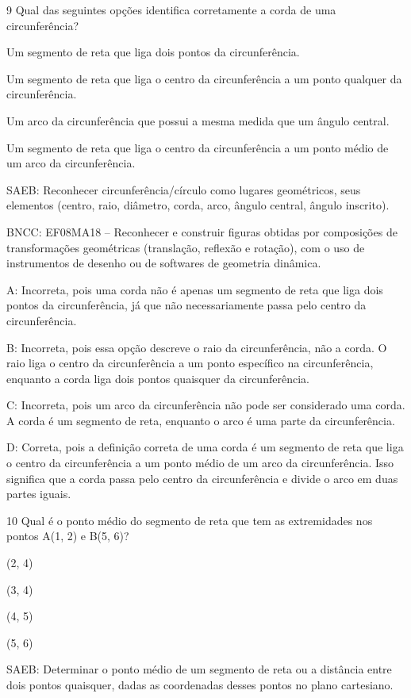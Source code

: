 {\num{9} Qual das seguintes opções identifica corretamente a corda de uma
circunferência?
\item Um segmento de reta que liga dois pontos da circunferência.
\item Um segmento de reta que liga o centro da circunferência a um ponto
qualquer da circunferência.
\item Um arco da circunferência que possui a mesma medida que um ângulo
central.
\item Um segmento de reta que liga o centro da circunferência a um ponto
médio de um arco da circunferência.

SAEB: Reconhecer circunferência/círculo como lugares geométricos, seus
elementos (centro, raio, diâmetro, corda, arco, ângulo central, ângulo
inscrito).

BNCC: EF08MA18 -- Reconhecer e construir figuras obtidas por composições
de transformações geométricas (translação, reflexão e rotação), com o
uso de instrumentos de desenho ou de softwares de geometria dinâmica.

A: Incorreta, pois uma corda não é apenas um segmento de reta que liga
dois pontos da circunferência, já que não necessariamente passa pelo
centro da circunferência.

B: Incorreta, pois essa opção descreve o raio da circunferência, não a
corda. O raio liga o centro da circunferência a um ponto específico na
circunferência, enquanto a corda liga dois pontos quaisquer da
circunferência.

C: Incorreta, pois um arco da circunferência não pode ser considerado
uma corda. A corda é um segmento de reta, enquanto o arco é uma parte da
circunferência.

D: Correta, pois a definição correta de uma corda é um segmento de reta
que liga o centro da circunferência a um ponto médio de um arco da
circunferência. Isso significa que a corda passa pelo centro da
circunferência e divide o arco em duas partes iguais.

\num{10} Qual é o ponto médio do segmento de reta que tem as extremidades nos
pontos A(1, 2) e B(5, 6)?
\item (2, 4)
\item (3, 4)
\item (4, 5)
\item (5, 6)

SAEB: Determinar o ponto médio de um segmento de reta ou a distância
entre dois pontos quaisquer, dadas as coordenadas desses pontos no plano
cartesiano.

}
